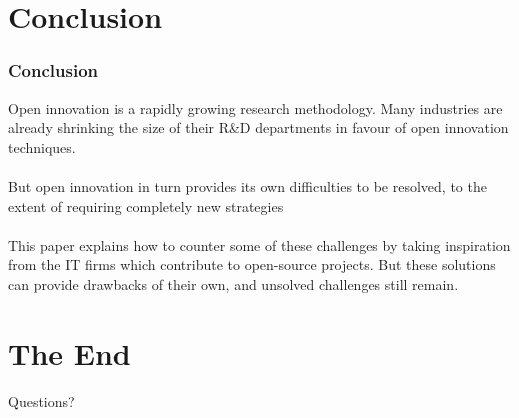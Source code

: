 \documentclass{beamer}
\begin{document}
\section{Conclusion}

\begin{frame}
\frametitle{Conclusion}
Open innovation is a rapidly growing research methodology. Many industries are already shrinking the size of their R\&D departments in favour of open innovation techniques.\\~\\

But open innovation in turn provides its own difficulties to be resolved, to the extent of requiring completely new strategies \\~\\

This paper explains how to counter some of these challenges by taking inspiration from the IT firms which contribute to open-source projects. But these solutions can provide drawbacks of their own, and unsolved challenges still remain.
\end{frame}

\section{The End}

\begin{frame}
\Huge{\centerline{Questions?}}
\end{frame}

\end{document}

